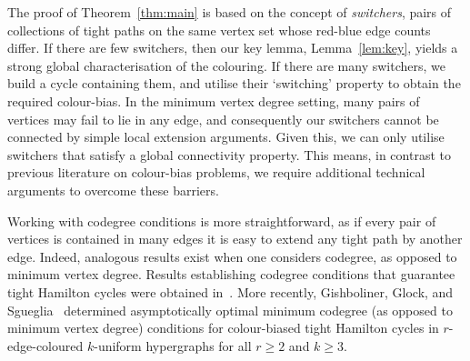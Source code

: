 \documentclass[A4paper,12pt]{article}
\theoremstyle{definition}
\begin{document}
The proof of Theorem~\ref{thm:main} is based on the concept of \textit{switchers}, pairs of collections of tight paths on the same vertex set whose red-blue edge counts differ.  If there are few switchers, then our key lemma, Lemma~\ref{lem:key}, yields a strong global characterisation of the colouring. If there are many switchers, we build a cycle containing them, and utilise their `switching' property to obtain the required colour-bias. In the minimum vertex degree setting, many pairs of vertices may fail to lie in any edge, and consequently our switchers cannot be connected by simple local extension arguments. Given this, we can only utilise switchers that satisfy a global connectivity property. This means, in contrast to previous literature on colour-bias problems, we require additional technical arguments to overcome these barriers.



Working with codegree conditions is more straightforward, as if every pair of vertices is contained in many edges it is easy to extend any tight path by another edge. Indeed, analogous results exist when one considers codegree, as opposed to minimum vertex degree. Results establishing codegree conditions that guarantee tight Hamilton cycles were obtained in~\cite{RodlRucinskiSzemeredi2006,RodlRucinskiSzemeredi2011}. More recently, Gishboliner, Glock, and Sgueglia~\cite{gishboliner2025tight} determined asymptotically optimal minimum codegree (as opposed to minimum vertex degree) conditions for colour-biased tight Hamilton cycles in $r$-edge-coloured $k$-uniform hypergraphs for all $r \ge 2$ and $k \ge 3$. 
\end{document}
